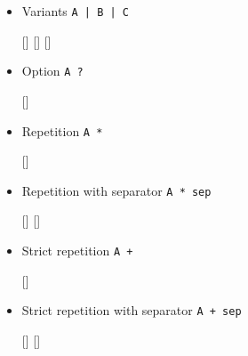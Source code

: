 \begin{isabellebody}
\begin{isamarkuptext}
\begin{itemize}
  \begin{railoutput}
[]
[]
[]
[]
[]
[]
\rail@end
\end{railoutput}


  \item Variants \verb|A |\verb,|,\verb| B |\verb,|,\verb| C|

  \begin{railoutput}
\rail@bar
{}[]
[]
[]
\rail@endbar
\rail@end
\end{railoutput}


  \item Option \verb|A ?|

  \begin{railoutput}
\rail@bar
{}
[]
\rail@endbar
\rail@end
\end{railoutput}


  \item Repetition \verb|A *|

  \begin{railoutput}
\rail@plus
{}
[]
\rail@endplus
\rail@end
\end{railoutput}


  \item Repetition with separator \verb|A * sep|

  \begin{railoutput}
\rail@bar
{}
\rail@plus
{}[]
[]
\rail@endplus
\rail@endbar
\rail@end
\end{railoutput}


  \item Strict repetition \verb|A +|

  \begin{railoutput}
\rail@plus
{}[]
\rail@endplus
\rail@end
\end{railoutput}


  \item Strict repetition with separator \verb|A + sep|

  \begin{railoutput}
\rail@plus
{}[]
[]
\rail@endplus
\rail@end
\end{railoutput}



\end{itemize}
\end{isamarkuptext}
\end{isabellebody}
